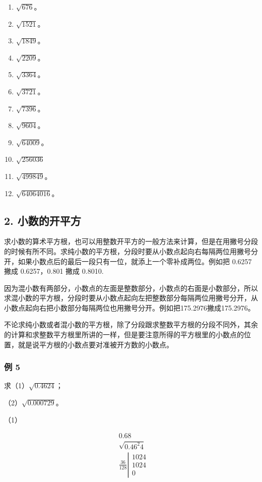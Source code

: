 \begin{enumerate}[start=1]
\item
  \(\sqrt{676}\)。
\item
  \(\sqrt{1521}\)。
\item
  \(\sqrt{1849}\)。
\item
  \(\sqrt{2209}\)。
\item
  \(\sqrt{3364}\)。
\item
  \(\sqrt{3721}\)。
\item
  \(\sqrt{7396}\)。
\item
  \(\sqrt{9604}\)。
\item
  \(\sqrt{64009}\)。
\item
  \(\sqrt{256036}\)
\item
  \(\sqrt{499849}\)。
\item
  \(\sqrt{64064016}\)。
\end{enumerate}

\subsection{2. 小数的开平方}

求小数的算术平方根，也可以用整数开平方的一般方法来计算，但是在用撇号分段的时候有所不同。求纯小数的平方根，分段时要从小数点起向右每隔两位用撇号分开，如果小数点后的最后一段只有一位，就添上一个零补成两位。例如把
0.6257 撇成 0.6257，0.801 撇成 0.8010.

因为混小数有两部分，小数点的左面是整数部分，小数点的右面是小数部分，所以求混小数的平方根，分段时要从小数点起向左把整数部分每隔两位用撇号分开，从小数点起向右把小数部分每隔两位也用撇号分开。例如把175.2976撇成175.2976。

不论求纯小数或者混小数的平方根，除了分段跟求整数平方根的分段不同外，其余的计算和求整数平方根里所讲的一样，但是要注意所得的平方根里的小数点的位置，就是说平方根的小数点要对准被开方数的小数点。

\subsubsection{例 5}

求（1）\(\sqrt{0.4624}\)；

（2）\(\sqrt{0.000729}\)。

 （1）

\[
\begin{array}{rl} & 0.68 \\ & \sqrt {0.46 ^ {2} 4} \\ & \frac{36}{128} \left| \begin{array}{l} 1024 \\ 1024 \\ \hline 0 \end{array} \right. \end{array}
\]

